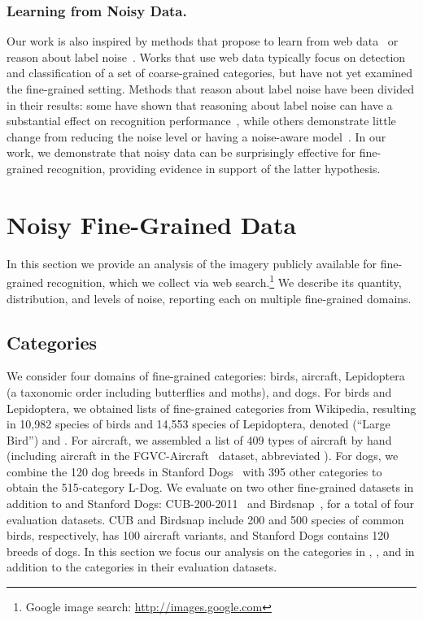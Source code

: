 \documentclass[runningheads]{llncs}
\begin{document}
\subsubsection{Learning from Noisy Data.}
Our work is also inspired by methods that propose to learn from web data~\cite{divvala2014learning,chen2015webly,chen2013neil,schroff2011harvesting,li2010optimol,fergus2010learning} or reason about label noise~\cite{mnih2012learning,xiao2015learning,horn2015,sukhbaatar2014learning,reed2014training}.
Works that use web data typically focus on detection and classification of a set of coarse-grained categories, but have not yet examined the fine-grained setting.
Methods that reason about label noise have been divided in their results: some have shown that reasoning about label noise can have a substantial effect on recognition performance~\cite{xiao2015application}, while others demonstrate little change from reducing the noise level or having a noise-aware model~\cite{sukhbaatar2014learning,reed2014training,horn2015}.
In our work, we demonstrate that noisy data can be surprisingly effective for fine-grained recognition, providing evidence in support of the latter hypothesis.


\section{Noisy Fine-Grained Data}
\label{sec:data}
In this section we provide an analysis of the imagery publicly available for fine-grained recognition, which we collect via web search.\footnote{Google image search: \url{http://images.google.com}}
We describe its quantity, distribution, and levels of noise, reporting each on multiple fine-grained domains.

\subsection{Categories}
\label{sec:data_categories}
We consider four domains of fine-grained categories: birds, aircraft, Lepidoptera (a taxonomic order including butterflies and moths), and dogs.
For birds and Lepidoptera, we obtained lists of fine-grained categories from Wikipedia, resulting in 10,982 species of birds and 14,553 species of Lepidoptera, denoted \lbird{} (``Large Bird'') and \llep{}.
For aircraft, we assembled a list of 409 types of aircraft by hand (including aircraft in the FGVC-Aircraft~\cite{maji13finegrained} dataset, abbreviated \fgvc{}).
For dogs, we combine the 120 dog breeds in Stanford Dogs~\cite{khosla2011novel} with 395 other categories to obtain the 515-category L-Dog.
We evaluate on two other fine-grained datasets in addition to \fgvc{} and Stanford Dogs: CUB-200-2011~\cite{wahcub2002011} and Birdsnap~\cite{bergbirdsnapcvpr2014}, for a total of four evaluation datasets.
CUB and Birdsnap include 200 and 500 species of common birds, respectively, \fgvc{} has 100 aircraft variants, and Stanford Dogs contains 120 breeds of dogs.
In this section we focus our analysis on the categories in \lbird{}, \llep{}, and \lair{} in addition to the categories in their evaluation datasets.
\end{document}
